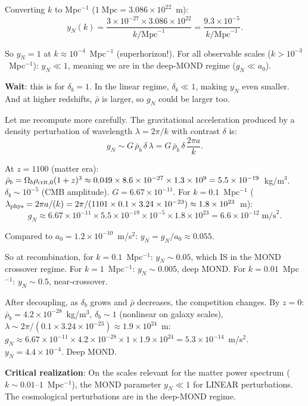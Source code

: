 \documentclass[11pt]{article}
\newcommand{\ee}[1]{\times 10^{#1}}
\begin{document}
Converting $k$ to Mpc$^{-1}$ ($1\;\text{Mpc} = 3.086\ee{22}$~m):
\begin{equation}
y_N(k) = \frac{3\ee{-27}\times 3.086\ee{22}}{k/\text{Mpc}^{-1}}
= \frac{9.3\ee{-5}}{k/\text{Mpc}^{-1}}.
\end{equation}

So $y_N = 1$ at $k \approx 10^{-4}$~Mpc$^{-1}$ (superhorizon!).
For all observable scales ($k > 10^{-3}$~Mpc$^{-1}$): $y_N \ll 1$,
meaning we are in the deep-MOND regime ($g_N \ll a_0$).

\textbf{Wait}: this is for $\delta_b = 1$. In the linear regime,
$\delta_b \ll 1$, making $y_N$ even smaller. And at higher redshifts,
$\bar\rho$ is larger, so $g_N$ could be larger too.

Let me recompute more carefully. The gravitational acceleration produced
by a density perturbation of wavelength $\lambda = 2\pi/k$ with contrast
$\delta$ is:
\begin{equation}
g_N \sim G\,\bar\rho_b\,\delta\,\lambda
= G\,\bar\rho_b\,\delta\,\frac{2\pi a}{k}.
\end{equation}

At $z = 1100$ (matter era): $\bar\rho_b = \Omega_b\rho_{\rm crit,0}(1+z)^3
\approx 0.049\times 8.6\ee{-27}\times 1.3\ee{9} = 5.5\ee{-19}$~kg/m$^3$.
$\delta_b \sim 10^{-5}$ (CMB amplitude). $G = 6.67\ee{-11}$.
For $k = 0.1$~Mpc$^{-1}$ ($\lambda_{\rm phys} = 2\pi a/(k) = 2\pi/(1101\times 0.1\times 3.24\ee{-23})
\approx 1.8\ee{23}$~m):
\begin{equation}
g_N \approx 6.67\ee{-11}\times 5.5\ee{-19}\times 10^{-5}\times 1.8\ee{23}
= 6.6\ee{-12}\;\text{m/s}^2.
\end{equation}

Compared to $a_0 = 1.2\ee{-10}$~m/s$^2$: $y_N = g_N/a_0 \approx 0.055$.

So at recombination, for $k = 0.1$~Mpc$^{-1}$: $y_N \sim 0.05$,
which IS in the MOND crossover regime. For $k = 1$~Mpc$^{-1}$:
$y_N \sim 0.005$, deep MOND. For $k = 0.01$~Mpc$^{-1}$: $y_N \sim 0.5$,
near-crossover.

After decoupling, as $\delta_b$ grows and $\bar\rho$ decreases, the
competition changes. By $z = 0$:
$\bar\rho_b = 4.2\ee{-28}$~kg/m$^3$, $\delta_b \sim 1$ (nonlinear
on galaxy scales), $\lambda \sim 2\pi/(0.1\times 3.24\ee{-23})
\approx 1.9\ee{24}$~m:
$g_N \approx 6.67\ee{-11}\times 4.2\ee{-28}\times 1\times 1.9\ee{24}
= 5.3\ee{-14}$~m/s$^2$.
$y_N = 4.4\ee{-4}$. Deep MOND.

\textbf{Critical realization}: On the scales relevant for the matter
power spectrum ($k \sim 0.01$--$1$~Mpc$^{-1}$), the MOND parameter
$y_N \ll 1$ for LINEAR perturbations. The cosmological perturbations
are in the deep-MOND regime.
\end{document}
